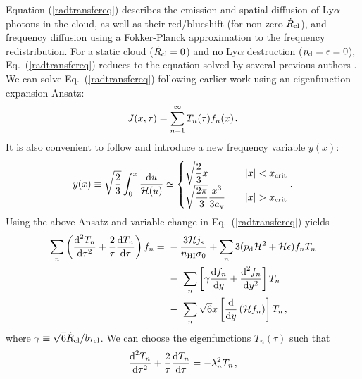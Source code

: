 \documentclass[fleqn,usenatbib]{mnras}
\newcommand{\taucl}{\tau_{\rm cl}}
\begin{document}
Equation (\ref{radtransfereq}) describes the emission and spatial diffusion of Ly$\alpha$ photons in the cloud, as well as their red/blueshift (for non-zero $\Dot{R}_{\rm cl}$), and frequency diffusion using a Fokker-Planck approximation to the frequency redistribution. For a static cloud ($\Dot{R}_{\rm cl} = 0$) and no Ly$\alpha$ destruction ($p_{\rm d} = \epsilon = 0$), Eq.~(\ref{radtransfereq}) reduces to the equation solved by several previous authors \citep[e.g.][]{Dijkstra2006, Lao2020, Seon2020, Tomaselli2021, McClellan2022}. We can solve Eq.~(\ref{radtransfereq}) following earlier work using an eigenfunction expansion Ansatz:
\begin{equation}
    J(x,\tau) = \sum_{n=1}^{\infty} T_n(\tau)f_n(x) \hspace{1 pt} \label{variable separataion eq}.
\end{equation}
It is also convenient to follow \cite{Harrington1973} and introduce a new frequency variable $y(x)$:
\begin{equation}
    y(x) \equiv \sqrt{\frac{2}{3}} \int_0^{x} \dfrac{\textrm{d}u}{\mathcal{H}(u)} \simeq \begin{cases}
        \sqrt{\dfrac{2}{3}} x  & \quad \lvert x \rvert < x_{\rm crit} \\ \sqrt{\dfrac{2 \pi}{3}} \dfrac{x^3}{3 a_{\rm v}} & \quad \lvert x \rvert > x_{\rm crit}
    \end{cases} \label{y(x) def}.
\end{equation}
Using the above Ansatz and variable change in Eq.~(\ref{radtransfereq}) yields 
\begin{align}
     \sum_{n} \left( \dfrac{\textrm{d}^2 T_n}{\textrm{d} \tau^2} + \dfrac{2}{\tau} \dfrac{\textrm{d} T_n}{\textrm{d} \tau} \right) f_n =~ &- \dfrac{3 \mathcal{H} j_{\rm s}}{ n_{\rm HI} \sigma_0} +  \sum_{n} 3 (p_{\rm d} \mathcal{H}^2 + \mathcal{H} \epsilon) f_n T_n \nonumber  \\ &-~ \sum_{n} \left[\gamma \dfrac{\textrm{d}f_n}{\textrm{d}y} +   \dfrac{\textrm{d}^2 f_n}{\textrm{d}y^2} \right]  T_n \nonumber \\  &-~ \sum_{n} \sqrt{6} \Bar{x} \left[ \dfrac{\textrm{d}}{\textrm{d}y} \left( \mathcal{H} f_n \right) \right] T_n  \hspace{1 pt} \label{before integrating},
\end{align}
where $\gamma \equiv \sqrt{6} \Dot{R}_{\rm cl}/b \taucl$. We can choose the eigenfunctions $T_n(\tau)$ such that 
\begin{equation}
    \dfrac{\textrm{d}^2 T_n}{\textrm{d} \tau^2} + \frac{2}{\tau} \dfrac{\textrm{d} T_n}{\textrm{d} \tau} = - \lambda_n^2 T_n \hspace{1 pt} \label{Tn equation},
\end{equation}
\end{document}
